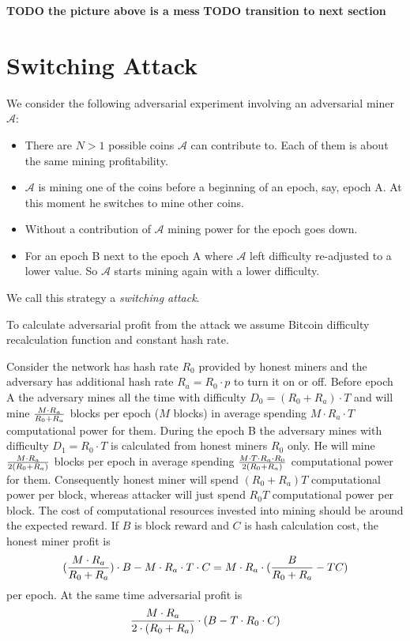 \documentclass[]{llncs}
\begin{document}
\textbf{TODO the picture above is a mess}
\textbf{TODO transition to next section}

\section{Switching Attack}
\label{sec:attack}

We consider the following adversarial experiment involving an adversarial miner \(\mathcal{A}\):

\begin{itemize}
\item There are \(N > 1\) possible coins \(\mathcal{A}\) can contribute to. Each of them is about the same mining profitability. 
\item \(\mathcal{A}\) is mining one of the coins before a beginning of an epoch, say, epoch A. At this moment he switches to mine other coins. 
\item Without a contribution of \(\mathcal{A}\) mining power for the epoch goes down. 
\item For an epoch B next to the epoch A where \(\mathcal{A}\) left difficulty re-adjusted to a lower value. So \(\mathcal{A}\) starts mining again with a lower difficulty. 
\end{itemize}

We call this strategy a \textit{switching attack}.

To calculate adversarial profit from the attack we assume Bitcoin difficulty recalculation function and constant hash rate.

Consider the network has hash rate \(R_0\) provided by honest miners and the adversary has additional hash rate \(R_a=R_0\cdot p\) to turn it on or off.
Before epoch A the adversary mines all the time with difficulty \(D_0 = (R_0+R_a) \cdot T\) and will mine \(M\cdot R_a\over R_0+R_a\) blocks per epoch (\(M\) blocks) in average spending \(M \cdot R_a \cdot T\) computational power for them.
During the epoch B the adversary mines with difficulty \(D_1 = R_0 \cdot T\) is calculated from honest miners \(R_0\) only.
He will mine \(M\cdot R_a\over 2(R_0+R_a)\) blocks per epoch in average spending \(M\cdot T\cdot R_a\cdot R_0\over 2(R_0+R_a)\) computational power for them.
Consequently honest miner will spend \((R_0+R_a)T\) computational power per block, whereas attacker will just spend \(R_0T\) computational power per block.
The cost of computational resources invested into mining should be around the expected reward.
If \(B\) is block reward and \(C\) is hash calculation cost, the honest miner profit is
\begin{equation}
{({M\cdot R_a\over R_0+R_a})\cdot B-M\cdot R_a\cdot T\cdot C=M\cdot R_a\cdot ({B\over R_0+R_a}-TC)}
\end{equation}
per epoch.
At the same time adversarial profit is
\begin{equation}
{{M\cdot R_a \over 2\cdot (R_0+R_a)}\cdot (B - T\cdot R_0\cdot C)}
\end{equation}
\end{document}

